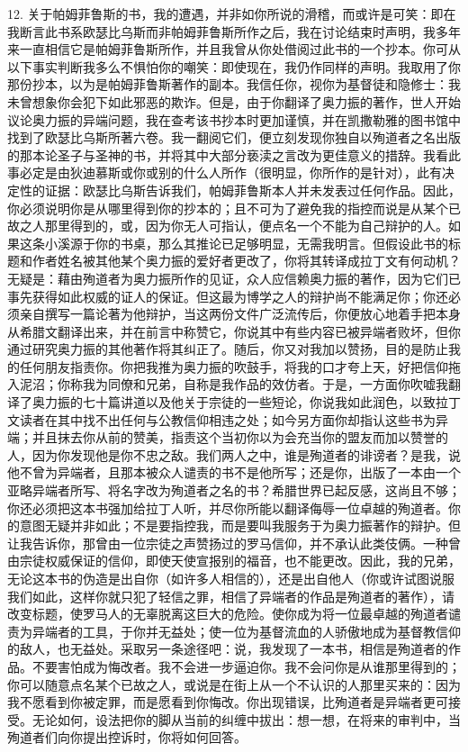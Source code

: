12. 关于帕姆菲鲁斯的书，我的遭遇，并非如你所说的滑稽，而或许是可笑：即在我断言此书系欧瑟比乌斯而非帕姆菲鲁斯所作之后，我在讨论结束时声明，我多年来一直相信它是帕姆菲鲁斯所作，并且我曾从你处借阅过此书的一个抄本。你可从以下事实判断我多么不惧怕你的嘲笑：即使现在，我仍作同样的声明。我取用了你那份抄本，以为是帕姆菲鲁斯著作的副本。我信任你，视你为基督徒和隐修士：我未曾想象你会犯下如此邪恶的欺诈。但是，由于你翻译了奥力振的著作，世人开始议论奥力振的异端问题，我在查考该书抄本时更加谨慎，并在凯撒勒雅的图书馆中找到了欧瑟比乌斯所著六卷。我一翻阅它们，便立刻发现你独自以殉道者之名出版的那本论圣子与圣神的书，并将其中大部分亵渎之言改为更佳意义的措辞。我看此事必定是由狄迪慕斯或你或别的什么人所作（很明显，你所作的是针对），此有决定性的证据：欧瑟比乌斯告诉我们，帕姆菲鲁斯本人并未发表过任何作品。因此，你必须说明你是从哪里得到你的抄本的；且不可为了避免我的指控而说是从某个已故之人那里得到的，或，因为你无人可指认，便点名一个不能为自己辩护的人。如果这条小溪源于你的书桌，那么其推论已足够明显，无需我明言。但假设此书的标题和作者姓名被其他某个奥力振的爱好者更改了，你将其转译成拉丁文有何动机？无疑是：藉由殉道者为奥力振所作的见证，众人应信赖奥力振的著作，因为它们已事先获得如此权威的证人的保证。但这最为博学之人的辩护尚不能满足你；你还必须亲自撰写一篇论著为他辩护，当这两份文件广泛流传后，你便放心地着手把本身从希腊文翻译出来，并在前言中称赞它，你说其中有些内容已被异端者败坏，但你通过研究奥力振的其他著作将其纠正了。随后，你又对我加以赞扬，目的是防止我的任何朋友指责你。你把我推为奥力振的吹鼓手，将我的口才夸上天，好把信仰拖入泥沼；你称我为同僚和兄弟，自称是我作品的效仿者。于是，一方面你吹嘘我翻译了奥力振的七十篇讲道以及他关于宗徒的一些短论，你说我如此润色，以致拉丁文读者在其中找不出任何与公教信仰相违之处；如今另方面你却指认这些书为异端；并且抹去你从前的赞美，指责这个当初你以为会充当你的盟友而加以赞誉的人，因为你发现他是你不忠之敌。我们两人之中，谁是殉道者的诽谤者？是我，说他不曾为异端者，且那本被众人谴责的书不是他所写；还是你，出版了一本由一个亚略异端者所写、将名字改为殉道者之名的书？希腊世界已起反感，这尚且不够；你还必须把这本书强加给拉丁人听，并尽你所能以翻译侮辱一位卓越的殉道者。你的意图无疑并非如此；不是要指控我，而是要叫我服务于为奥力振著作的辩护。但让我告诉你，那曾由一位宗徒之声赞扬过的罗马信仰，并不承认此类伎俩。一种曾由宗徒权威保证的信仰，即使天使宣报别的福音，也不能更改。因此，我的兄弟，无论这本书的伪造是出自你（如许多人相信的），还是出自他人（你或许试图说服我们如此，这样你就只犯了轻信之罪，相信了异端者的作品是殉道者的著作），请改变标题，使罗马人的无辜脱离这巨大的危险。使你成为将一位最卓越的殉道者谴责为异端者的工具，于你并无益处；使一位为基督流血的人骄傲地成为基督教信仰的敌人，也无益处。采取另一条途径吧：说，我发现了一本书，相信是殉道者的作品。不要害怕成为悔改者。我不会进一步逼迫你。我不会问你是从谁那里得到的；你可以随意点名某个已故之人，或说是在街上从一个不认识的人那里买来的：因为我不愿看到你被定罪，而是愿看到你悔改。你出现错误，比殉道者是异端者更可接受。无论如何，设法把你的脚从当前的纠缠中拔出：想一想，在将来的审判中，当殉道者们向你提出控诉时，你将如何回答。\par

